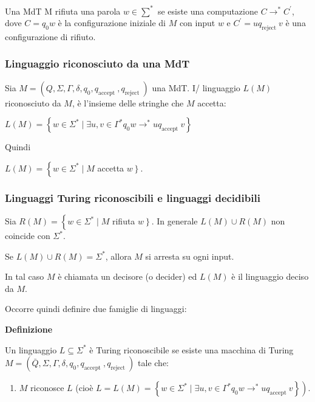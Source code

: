 Una MdT M rifiuta una parola $w \in \sum^{*}$ se esiste una computazione $C \rightarrow^{*} C^{\prime}$, dove $C=q_{0} w$ è la configurazione iniziale di $M$ con input $w$ e $C^{\prime}=u q_{\text {reject }} v$ è una configurazione di rifiuto.

\subsubsection{Linguaggio riconosciuto da una MdT}

Sia $M=\left(Q, \Sigma, \Gamma, \delta, q_{0}, q_{\text {accept }}, q_{\text {reject }}\right)$ una MdT. I/ linguaggio $L(M)$ riconosciuto da $M$, è l'insieme delle stringhe che $M$ accetta:

$L(M)=\left\{w \in \Sigma^{*} \mid \exists u, v \in \Gamma^{*} q_{0} w \rightarrow^{*} u q_{\text {accept }} v\right\}$


Quindi

$L(M)=\left\{w \in \Sigma^{*} \mid M\right.$ accetta $\left.w\right\} .$

\subsubsection{Linguaggi Turing riconoscibili e linguaggi decidibili}

Sia $R(M)=\left\{w \in \Sigma^{*} \mid M\right.$ rifiuta $\left.w\right\} .$
In generale $L(M) \cup R(M)$ non coincide con $\Sigma^{*}$.

Se $L(M) \cup R(M)=\Sigma^{*}$, allora $M$ si arresta su ogni input.

In tal caso $M$ è chiamata un decisore (o decider) ed $L(M)$ è il linguaggio deciso da $M$.

\vspace{5mm}

Occorre quindi definire due famiglie di linguaggi:

\vspace{5mm}

\textbf{Definizione}

Un linguaggio $L \subseteq \Sigma^{*}$ è Turing riconoscibile se esiste una macchina di Turing $M=\left(\bar{Q}, \Sigma, \Gamma, \delta, q_{0}, q_{\text {accept }}, q_{\text {reject }}\right)$ tale che:
\begin{enumerate}
    \item $M$ riconosce $L$ (cioè $\left.L=L(M)=\left\{w \in \Sigma^{*} \mid \exists u, v \in \Gamma^{*} q_{0} w \rightarrow^{*} u q_{\text {accept }} v\right\}\right)$.
\end{enumerate}


